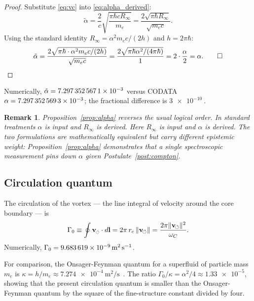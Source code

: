 \documentclass[aps,pra,preprint,longbibliography,nofootinbib]{revtex4-2}
\newtheorem{remark}{Remark}
\newcommand{\rotarrow}{%
  \mathchoice{\mkern-2mu\scriptstyle\boldsymbol{\circlearrowleft}}%
             {\mkern-2mu\scriptstyle\boldsymbol{\circlearrowleft}}%
             {\mkern-2mu\scriptscriptstyle\boldsymbol{\circlearrowleft}}%
             {\mkern-2mu\scriptscriptstyle\boldsymbol{\circlearrowleft}}}
\newcommand{\vc}{\mathbf{v}_{\rotarrow}}        %
\newcommand{\vnorm}{\lVert\mathbf{v}_{\!\boldsymbol{\circlearrowleft}}\rVert} %
\newcommand{\rc}{r_c}                            %
\newcommand{\omC}{\omega_C}                      %
\newcommand{\Rinf}{R_\infty}                     %
\newcommand{\Gz}{\Gamma_0}                       %
\begin{document}
\begin{proof}
Substitute \eqref{eq:vc} into \eqref{eq:alpha_derived}:
\begin{equation}
  \tilde\alpha = \frac{2}{c}\sqrt{\frac{\pi\hbar c\Rinf}{m_e}}
  = \frac{2\sqrt{\pi\hbar\Rinf}}{\sqrt{m_e c}}.
\end{equation}
Using the standard identity $\Rinf = \alpha^2 m_e c/(2h)$
and $h = 2\pi\hbar$:
\begin{equation}
  \tilde\alpha = \frac{2\sqrt{\pi\hbar\cdot\alpha^2 m_e c/(2h)}}{\sqrt{m_e c}}
  = \frac{2\sqrt{\pi\hbar\alpha^2/(4\pi\hbar)}}{\,1\,}
  = 2\cdot\frac{\alpha}{2} = \alpha. \qed
\end{equation}
\end{proof}

Numerically, $\tilde\alpha = \num{7.297\,352\,567\,1e-3}$ versus
CODATA $\alpha = \num{7.297\,352\,569\,3e-3}$;
the fractional difference is $\SI{3e-10}{}$.

\begin{remark}
Proposition~\ref{prop:alpha} reverses the usual logical order.
In standard treatments $\alpha$ is input and $\Rinf$ is derived.
Here $\Rinf$ is input and $\alpha$ is derived.
The two formulations are mathematically equivalent but carry different
epistemic weight: Proposition~\ref{prop:alpha} demonstrates that
a single spectroscopic measurement pins down $\alpha$
given Postulate~\ref{post:compton}.
\end{remark}

\subsection{Circulation quantum}
\label{sec:Gamma0}

The circulation of the vortex — the line integral of velocity around
the core boundary — is
\begin{equation}
  \Gz \equiv \oint \vc\cdot d\mathbf{l}
           = 2\pi\,\rc\,\vnorm
           = \frac{2\pi\vnorm^2}{\omC}.
  \label{eq:Gamma0}
\end{equation}
Numerically, $\Gz = \SI{9.683\,619e-9}{\meter\squared\per\second}$.

For comparison, the Onsager-Feynman quantum for a superfluid of
particle mass $m_e$ is
$\kappa = h/m_e \approx \SI{7.274e-4}{\meter\squared\per\second}$~\cite{Onsager1949,Feynman1955}.
The ratio $\Gz/\kappa = \alpha^2/4 \approx \num{1.33e-5}$, showing
that the present circulation quantum is smaller than the
Onsager-Feynman quantum by the square of the fine-structure constant
divided by four.
\end{document}

